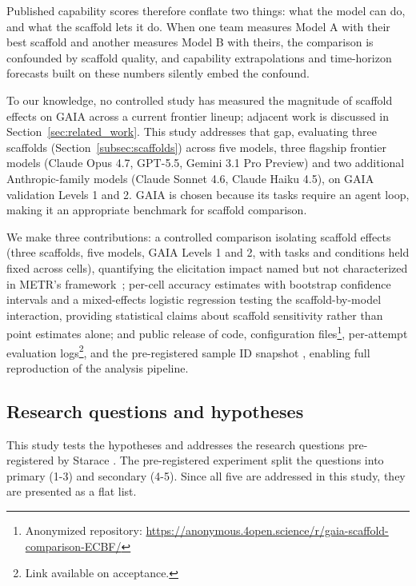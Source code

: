\documentclass[10pt]{article} %
\begin{document}
    Published capability scores therefore conflate two things: what the model can do, and what the scaffold lets it do. When one team measures Model A with their best scaffold and another measures Model B with theirs, the comparison is confounded by scaffold quality, and capability extrapolations and time-horizon forecasts built on these numbers silently embed the confound.

    To our knowledge, no controlled study has measured the magnitude of scaffold effects on GAIA across a current frontier lineup; adjacent work is discussed in Section~\ref{sec:related_work}. This study addresses that gap, evaluating three scaffolds (Section~\ref{subsec:scaffolds}) across five models, three flagship frontier models (Claude Opus 4.7, GPT-5.5, Gemini 3.1 Pro Preview) and two additional Anthropic-family models (Claude Sonnet 4.6, Claude Haiku 4.5), on GAIA validation Levels 1 and 2. GAIA is chosen because its tasks require an agent loop, making it an appropriate benchmark for scaffold comparison.

    We make three contributions: a controlled comparison isolating scaffold effects (three scaffolds, five models, GAIA Levels 1 and 2, with tasks and conditions held fixed across cells), quantifying the elicitation impact named but not characterized in METR's framework~\citep{kwa2026measuring}; per-cell accuracy estimates with bootstrap confidence intervals and a mixed-effects logistic regression testing the scaffold-by-model interaction, providing statistical claims about scaffold sensitivity rather than point estimates alone; and public release of code, configuration files\footnote{Anonymized repository: \url{https://anonymous.4open.science/r/gaia-scaffold-comparison-ECBF/}}, per-attempt evaluation logs\footnote{Link available on acceptance.}, and the pre-registered sample ID snapshot \citep{starace2026prereg}, enabling full reproduction of the analysis pipeline.

    \subsection{Research questions and hypotheses}

    This study tests the hypotheses and addresses the research questions pre-registered by Starace \citep{starace2026prereg}. The pre-registered experiment split the questions into primary (1-3) and secondary (4-5). Since all five are addressed in this study, they are presented as a flat list.
\end{document}
